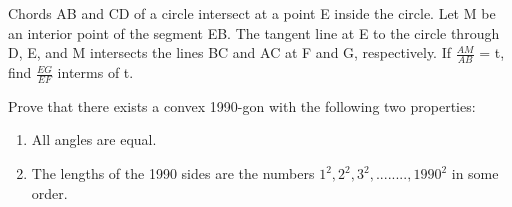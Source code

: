 \item Chords AB and CD of a circle intersect at a point E inside the circle. Let M be an interior point of the segment EB. The tangent line at E to the circle through D, E, and M intersects the lines BC and AC at F and G, respectively. If $\frac{AM}{AB}$ = t, find $\frac{EG}{EF}$ interms of t.

\item Prove that there exists a convex 1990-gon with the following two properties:
\begin{enumerate}
\item All angles are equal.
\item The lengths of the 1990 sides are the numbers $1^2, 2^2, 3^2,........, 1990^2$ in some order.
\end{enumerate}



